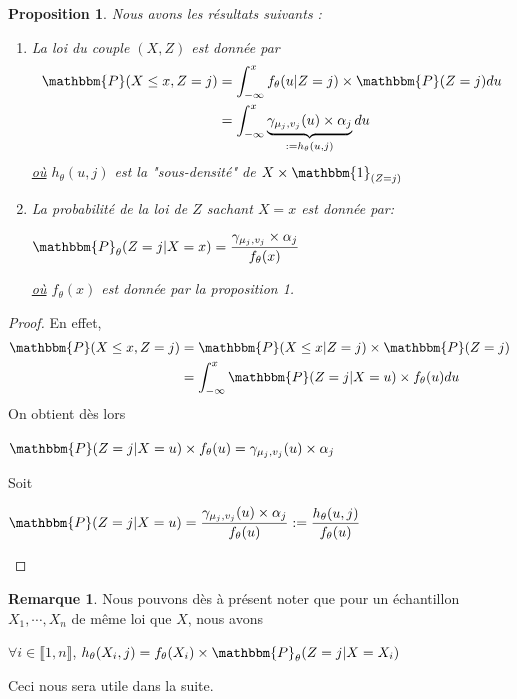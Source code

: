 \documentclass[frenchb]{report}
\newcommand{\1}{\mathbbm{1}}
\newcommand{\prob}{\mathbbm{P}}
\newtheorem{prop}{Proposition}
\theoremstyle{definition}\newtheorem{defn}{Définition}
\theoremstyle{definition}\newtheorem{exm}{Exemple}
\theoremstyle{definition}\newtheorem{nota}{Notation}
\theoremstyle{definition}\newtheorem{rem}{Remarque}
\begin{document}
\begin{prop} Nous avons les résultats suivants :
\begin{enumerate}
\item La loi du couple $(X,Z)$ est donnée par 
\begin{align*} 
\prob(X\leq x, Z = j) &= \displaystyle\int_{-\infty}^x f_\theta(u | Z = j)\times\prob(Z=j)du\\
&= \displaystyle\int_{-\infty}^x  \underbrace{\gamma_{\mu_j, v_j}(u) \times \alpha_j }_{:= h_\theta(u,j)}du
\end{align*}
\underline{où} $h_\theta(u,j)$ est la "sous-densité" de $X\times\1_{(Z=j)}$
\item La probabilité de la loi de $Z$ sachant $X=x$ est donnée par:
\begin{center} $\prob_\theta(Z = j | X = x)=\displaystyle \frac{\gamma_{\mu_j, v_j}\times\alpha_j}{f_\theta(x)}$ \end{center}
\underline{où} $f_\theta(x)$ est donnée par la proposition 1.
\end{enumerate}
\end{prop}

\begin{proof}
En effet, 
\begin{align*}
\prob(X\leq x, Z = j) &= \prob(X\leq x | Z = j) \times \prob(Z = j) \\
&= \displaystyle\int_{-\infty}^x \prob(Z = j | X = u) \times f_\theta(u) du
\end{align*}
On obtient dès lors
\begin{center}
$\prob(Z = j | X = u)\times f_\theta(u) = \gamma_{\mu_j, v_j}(u) \times \alpha_j$
\end{center}
Soit
\begin{center}
$\prob(Z = j | X = u) = \displaystyle\frac{\gamma_{\mu_j, v_j}(u)\times\alpha_j}{f_\theta(u)} := \frac{h_\theta(u,j)}{f_\theta(u)}$
\end{center}
\end{proof}

\begin{rem}
Nous pouvons dès à présent noter que pour un échantillon $X_1, \cdots, X_n$ de même loi que $X$, nous avons 
\begin{center}
$\forall i \in \llbracket 1,n \rrbracket$, $h_\theta(X_i,j) = f_\theta(X_i) \times \prob_\theta(Z = j | X = X_i )$
\end{center}
Ceci nous sera utile dans la suite.
\end{rem}
\end{document}
